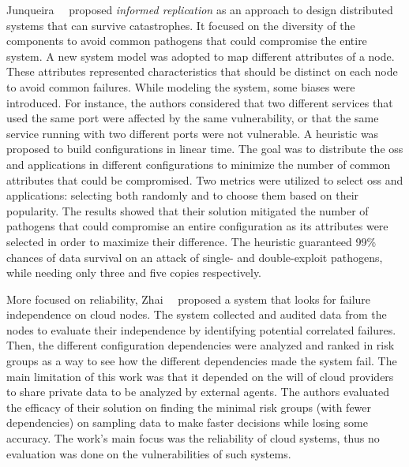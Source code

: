 Junqueira~\etal{}~\cite{Junqueira:2005} proposed \emph{informed replication} as an approach to design distributed systems that can survive catastrophes.
It focused on the diversity of the components to avoid common pathogens that could compromise the entire system.
A new system model was adopted to map different attributes of a node. 
These attributes represented characteristics that should be distinct on each node to avoid common failures.
While modeling the system, some biases were introduced.
For instance, the authors considered that two different services that used the same port were affected by the same vulnerability, or that the same service running with two different ports were not vulnerable.
A heuristic was proposed to build configurations in linear time.
The goal was to distribute the \glspl{os} and applications in different configurations to minimize the number of common attributes that could be compromised.
Two metrics were utilized to select \glspl{os} and applications: selecting both randomly and to choose them based on their popularity.
The results showed that their solution mitigated the number of pathogens that could compromise an entire configuration as its attributes were selected in order to maximize their difference.
The heuristic guaranteed 99\% chances of data survival on an attack of single- and double-exploit pathogens, while needing only three and five copies respectively.


More focused on reliability, Zhai~\etal{}~\cite{Zhai:2014} proposed a system that looks for failure independence on cloud nodes.
The system collected and audited data from the nodes to evaluate their independence by identifying potential correlated failures.
Then, the different configuration dependencies were analyzed and ranked in risk groups as a way to see how the different dependencies made the system fail.
The main limitation of this work was that it depended on the will of cloud providers to share private data to be analyzed by external agents.
The authors evaluated the efficacy of their solution on finding the minimal risk groups (with fewer dependencies) on sampling data to make faster decisions while losing some accuracy.
The work's main focus was the reliability of cloud systems, thus no evaluation was done on the vulnerabilities of such systems.

